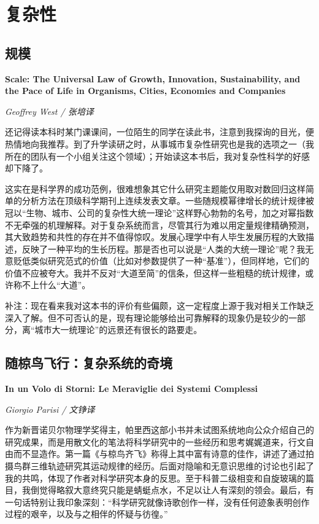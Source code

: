 \section{复杂性}

\subsection*{规模}
\par \textbf{Scale: The Universal Law of Growth, Innovation, Sustainability, and the Pace of Life in Organisms, Cities, Economies and Companies}
\par \emph{Geoffrey West / 张培译} 

\par 还记得读本科时某门课课间，一位陌生的同学在读此书，注意到我探询的目光，便热情地向我推荐。到了升学读研之时，从事城市复杂性研究也是我的选项之一（我所在的团队有一个小组关注这个领域）；开始读这本书后，我对复杂性科学的好感却下降了。
\par 这实在是科学界的成功范例，很难想象其它什么研究主题能仅用取对数回归这样简单的分析方法在顶级科学期刊上连续发表文章。一些随规模幂律增长的统计规律被冠以“生物、城市、公司的复杂性大统一理论”这样野心勃勃的名号，加之对幂指数不无牵强的机理解释。对于复杂系统而言，尽管其行为难以用定量规律精确预测，其大致趋势和共性的存在并不值得惊叹。发展心理学中有人毕生发展历程的大致描述，反映了一种平均的生长历程。那是否也可以说是“人类的大统一理论”呢？我无意贬低类似研究范式的价值（比如对参数提供了一种“基准”），但同样地，它们的价值不应被夸大。我并不反对“大道至简”的信条，但这样一些粗糙的统计规律，或许称不上什么“大道”。
\par {}

\par 补注：现在看来我对这本书的评价有些偏颇，这一定程度上源于我对相关工作缺乏深入了解。但不可否认的是，现有理论能够给出可靠解释的现象仍是较少的一部分，离“城市大一统理论”的远景还有很长的路要走。
\par {}

\subsection*{随椋鸟飞行：复杂系统的奇境}
\par \textbf{In un Volo di Storni: Le Meraviglie dei Systemi Complessi}
\par \emph{Giorgio Parisi / 文铮译} 

\par 作为新晋诺贝尔物理学奖得主，帕里西这部小书并未试图系统地向公众介绍自己的研究成果，而是用散文化的笔法将科学研究中的一些经历和思考娓娓道来，行文自由而不显造作。第一篇《与椋鸟齐飞》称得上其中富有诗意的佳作，讲述了通过拍摄鸟群三维轨迹研究其运动规律的经历。后面对隐喻和无意识思维的讨论也引起了我的共鸣，体现了作者对科学研究本身的反思。至于科普二级相变和自旋玻璃的篇目，我倒觉得略叙大意终究只能是蜻蜓点水，不足以让人有深刻的领会。最后，有一句话特别让我印象深刻：“科学研究就像诗歌创作一样，没有任何迹象表明创作过程的艰辛，以及与之相伴的怀疑与彷徨。”
\par {}


